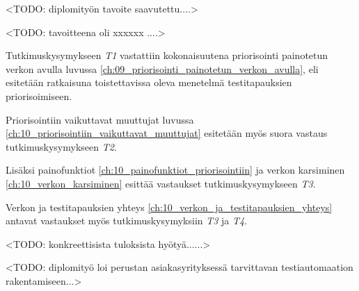<TODO: diplomityön tavoite saavutettu....>

<TODO: tavoitteena oli xxxxxx ....>

Tutkimuskysymykseen \emph{T1} vastattiin kokonaisuutena priorisointi painotetun verkon avulla luvussa \ref{ch:09_priorisointi_painotetun_verkon_avulla}, eli esitetään ratkaisuna toistettavissa oleva menetelmä testitapauksien priorisoimiseen.

Priorisointiin vaikuttavat muuttujat luvussa \ref{ch:10_priorisointiin_vaikuttavat_muuttujat} esitetään myös suora vastaus tutkimuskysymykseen \emph{T2}.

Lisäksi painofunktiot \ref{ch:10_painofunktiot_priorisointiin} ja verkon karsiminen \ref{ch:10_verkon_karsiminen} esittää vastaukset tutkimuskysymykseen \emph{T3}.

Verkon ja testitapauksien yhteys \ref{ch:10_verkon_ja_testitapauksien_yhteys} antavat vastaukset myös tutkimuskysymyksiin \emph{T3} ja \emph{T4}.

<TODO: konkreettisista tuloksista hyötyä......>

<TODO: diplomityö loi perustan asiakasyrityksessä tarvittavan testiautomaation rakentamiseen...>